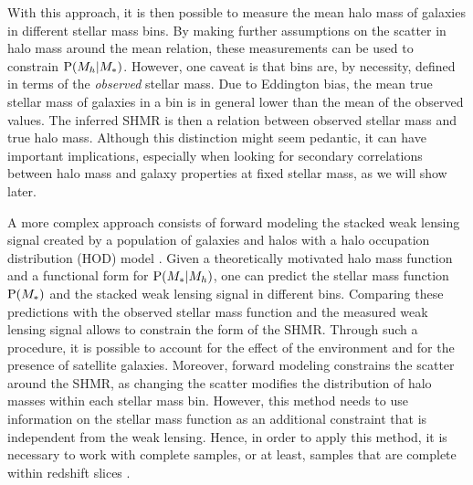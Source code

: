 \documentclass[usenatbib]{mnras}
\def\mstar{M_*}
\def\mhalo{M_{h}}
\def\pr{{\rm P}}
\begin{document}
With this approach, it is then possible to measure the mean halo mass of galaxies in different stellar mass bins. By making further assumptions on the scatter in halo mass around the mean relation, these measurements can be used to constrain $\pr(\mhalo|\mstar)$.
However, one caveat is that bins are, by necessity, defined in terms of the {\em observed} stellar mass. Due to Eddington bias, the mean true stellar mass of galaxies in a bin is in general lower than the mean of the observed values. 
The inferred SHMR is then a relation between observed stellar mass and true halo mass. Although this distinction might seem pedantic, it can have important implications, especially when looking for secondary correlations between halo mass and galaxy properties at fixed stellar mass, as we will show later.

A more complex approach consists of forward modeling the stacked weak lensing signal created by a population of galaxies and halos with a halo occupation distribution (HOD) model \citep[e.g.][]{Lea++12, Tin++13, Z+M15}.
Given a theoretically motivated halo mass function and a functional form for $\pr(\mstar|\mhalo)$, one can predict the stellar mass function $\pr(\mstar)$ and the stacked weak lensing signal in different bins.
Comparing these predictions with the observed stellar mass function and the measured weak lensing signal allows to constrain the form of the SHMR.
Through such a procedure, it is possible to account for the effect of the environment and for the presence of satellite galaxies. 
Moreover, forward modeling constrains the scatter around the SHMR, as changing the scatter modifies the distribution of halo masses within each stellar mass bin. However, this method needs to use information on the stellar mass function as an additional constraint that is independent from the weak lensing. Hence, in order to apply this method, it is necessary to work with complete samples, or at least, samples that are complete within redshift slices \citep{Z+M15}.
\end{document}
